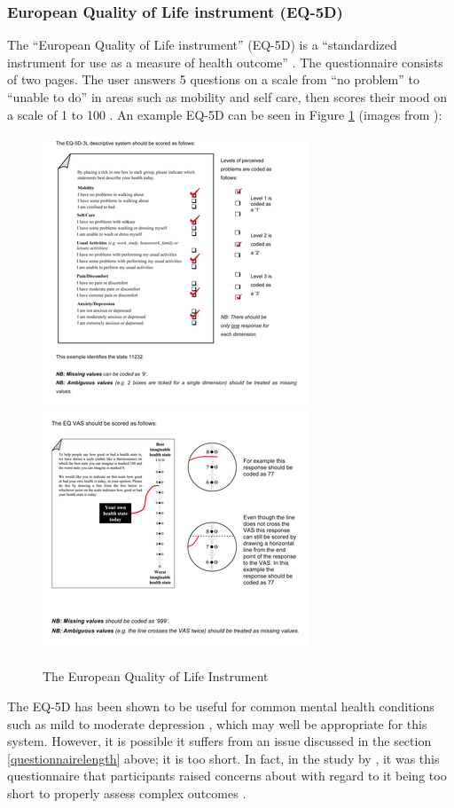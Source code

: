 \documentclass[11pt,openright,a4paper]{report}
\begin{document}
\newpage
\subsubsection{European Quality of Life instrument (EQ-5D)}
The \enquote{European Quality of Life instrument} (EQ-5D) is a \enquote{standardized instrument for use as a measure of health outcome} \parencite{eq5dabout}. The questionnaire consists of two pages. The user answers 5 questions on a scale from \enquote{no problem} to \enquote{unable to do} in areas such as mobility and self care, then scores their mood on a scale of 1 to 100 \parencite{eq5duse}. An example EQ-5D can be seen in Figure \ref{fig:eq5d} (images from \parencite{eq5duse}):

\begin{figure}[ht]
\caption{The European Quality of Life Instrument}
\includegraphics[width=.5\textwidth]{i/eq5d1.jpg}\hfill
\includegraphics[width=.5\textwidth]{i/eq5d2.jpg}
\label{fig:eq5d}
\end{figure}

The EQ-5D has been shown to be useful for common mental health conditions such as mild to moderate depression \parencite{brazier2010eq}, which may well be appropriate for this system. However, it is possible it suffers from an issue discussed in the section \ref{questionnairelength} above; it is too short. In fact, in the study by \citeauthor{crawford2011selecting}, it was this questionnaire that participants raised concerns about with regard to it being too short to properly assess complex outcomes \parencite{crawford2011selecting}.
\end{document}
